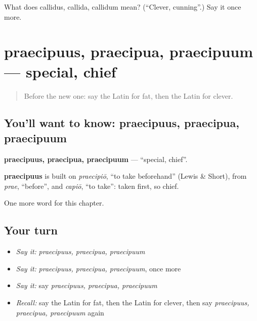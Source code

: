 \begin{tcolorbox}[breakable,colback=teal!4,colframe=teal!35!black,title={Before you move on}]
What does callidus, callida, callidum mean? (\textquotedblleft{}Clever, cunning\textquotedblright{}.) Say it once more.
\end{tcolorbox}
\section[praecipuus, praecipua, praecipuum]{praecipuus, praecipua, praecipuum — special, chief}

\label{lesson:LA-C267-praecipuus}



\begin{quote}
Before the new one: say the Latin for fat, then the Latin for clever.
\end{quote}

\subsection*{You'll want to know: praecipuus, praecipua, praecipuum}
\textbf{praecipuus, praecipua, praecipuum} — \textquotedblleft{}special, chief\textquotedblright{}.

\begin{cousinweb}
\textbf{praecipuus} is built on \emph{praecipiō}, \textquotedblleft{}to take beforehand\textquotedblright{} (Lewis \& Short), from \emph{prae}, \textquotedblleft{}before\textquotedblright{}, and \emph{capiō}, \textquotedblleft{}to take\textquotedblright{}: taken first, so chief.
\end{cousinweb}

\begin{grammarlens}[title={What you've built}]
One more word for this chapter.
\end{grammarlens}

\subsection*{Your turn}
\begin{itemize}
\raggedright
  \item \emph{Say it:} \emph{praecipuus, praecipua, praecipuum}
  \item \emph{Say it:} \emph{praecipuus, praecipua, praecipuum}, once more
  \item \emph{Say it:} say \emph{praecipuus, praecipua, praecipuum}
  \item \emph{Recall:} say the Latin for fat, then the Latin for clever, then say \emph{praecipuus, praecipua, praecipuum} again
\end{itemize}

